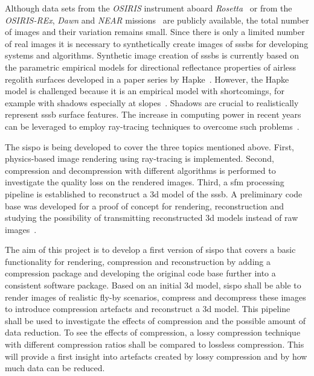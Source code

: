 Although data sets from the \textit{OSIRIS} instrument aboard \textit{Rosetta}~\cite{osirisArchive} or from the \textit{OSIRIS-REx}, \textit{Dawn} and \textit{NEAR} missions~\cite{palmer2014small} are publicly available, the total number of images and their variation remains small. Since there is only a limited number of real images it is necessary to synthetically create images of \glspl{sssb} for developing systems and algorithms. Synthetic image creation of \glspl{sssb} is currently based on the parametric empirical models for directional reflectance properties of airless regolith surfaces developed in a paper series by Hapke~\cite{Hapke1981BidirectionalTheory, hapke1981bidirectional2, Hapke1984BidirectionalRoughness, Hapke1986BidirectionalEffect, Hapke2002BidirectionalScattering, Hapke2008BidirectionalPorosity, Hapke2012Bidirectional7}. However, the Hapke model is challenged because it is an empirical model with shortcomings, for example with shadows especially at slopes~\cite{shkuratov2012critical}. Shadows are crucial to realistically represent \gls{sssb} surface features. The increase in computing power in recent years can be leveraged to employ ray-tracing techniques to overcome such problems~\cite{shkuratov2012critical, lafortune1996mathematical}.


The \gls{sispo} is being developed to cover the three topics mentioned above. First, physics-based image rendering using ray-tracing is implemented. Second, compression and decompression with different algorithms is performed to investigate the quality loss on the rendered images. Third, a \gls{sfm} processing pipeline is established to reconstruct a \gls{3d} model of the \gls{sssb}. A preliminary code base was developed for a proof of concept for rendering, reconstruction and studying the possibility of transmitting reconstructed \gls{3d} models instead of raw images~\cite{Pajusalu2019CharacterizationMapping}.

The aim of this project is to develop a first version of \gls{sispo} that covers a basic functionality for rendering, compression and reconstruction by adding a compression package and developing the original code base further into a consistent software package. Based on an initial \gls{3d} model, \gls{sispo} shall be able to render images of realistic fly-by scenarios, compress and decompress these images to introduce compression artefacts and reconstruct a \gls{3d} model. This pipeline shall be used to investigate the effects of compression and the possible amount of data reduction. To see the effects of compression, a lossy compression technique with different compression ratios shall be compared to lossless compression. This will provide a first insight into artefacts created by lossy compression and by how much data can be reduced.

